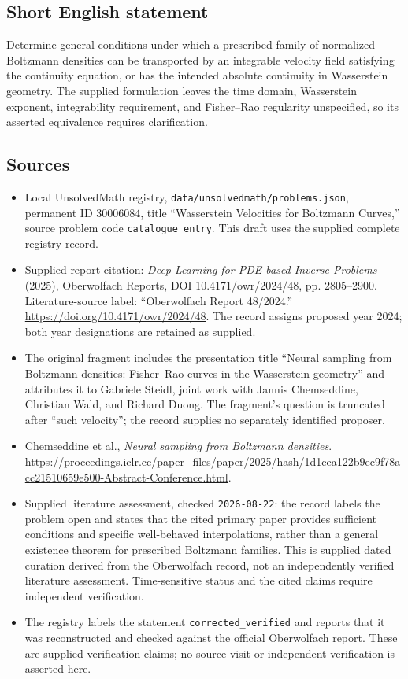 \documentclass[11pt]{article}
\begin{document}
\subsection{Short English statement}
Determine general conditions under which a prescribed family of normalized Boltzmann densities can be transported by an integrable velocity field satisfying the continuity equation, or has the intended absolute continuity in Wasserstein geometry. The supplied formulation leaves the time domain, Wasserstein exponent, integrability requirement, and Fisher--Rao regularity unspecified, so its asserted equivalence requires clarification.
\subsection{Sources}
\begin{itemize}
\item Local UnsolvedMath registry, \texttt{data/unsolvedmath/problems.json}, permanent ID \(30006084\), title ``Wasserstein Velocities for Boltzmann Curves,'' source problem code \texttt{catalogue entry}. This draft uses the supplied complete registry record.
\item Supplied report citation: \emph{Deep Learning for PDE-based Inverse Problems} (2025), Oberwolfach Reports, DOI 10.4171/owr/2024/48, pp. 2805--2900. Literature-source label: ``Oberwolfach Report 48/2024.'' \url{https://doi.org/10.4171/owr/2024/48}. The record assigns proposed year 2024; both year designations are retained as supplied.
\item The original fragment includes the presentation title ``Neural sampling from Boltzmann densities: Fisher--Rao curves in the Wasserstein geometry'' and attributes it to Gabriele Steidl, joint work with Jannis Chemseddine, Christian Wald, and Richard Duong. The fragment's question is truncated after ``such velocity''; the record supplies no separately identified proposer.
\item Chemseddine et al., \emph{Neural sampling from Boltzmann densities}. \url{https://proceedings.iclr.cc/paper_files/paper/2025/hash/1d1cea122b9ec9f78acc21510659e500-Abstract-Conference.html}.
\item Supplied literature assessment, checked \texttt{2026-08-22}: the record labels the problem open and states that the cited primary paper provides sufficient conditions and specific well-behaved interpolations, rather than a general existence theorem for prescribed Boltzmann families. This is supplied dated curation derived from the Oberwolfach record, not an independently verified literature assessment. Time-sensitive status and the cited claims require independent verification.
\item The registry labels the statement \texttt{corrected\_verified} and reports that it was reconstructed and checked against the official Oberwolfach report. These are supplied verification claims; no source visit or independent verification is asserted here.
\end{itemize}
\end{document}
